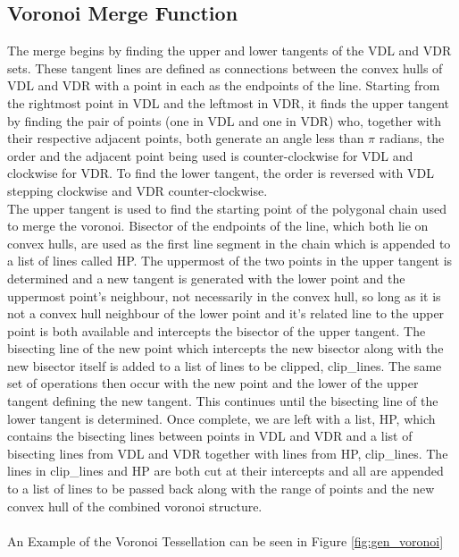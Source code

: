 \subsection{Voronoi Merge Function}
The merge begins by finding the upper and lower tangents of the VDL and VDR sets. These tangent lines are defined as connections between the convex hulls of VDL and VDR with a point in each as the endpoints of the line. Starting from the rightmost point in VDL and the leftmost in VDR, it finds the upper tangent by finding the pair of points (one in VDL and one in VDR) who, together with their respective adjacent points, both generate an angle less than $\pi$ radians, the order and the adjacent point being used is counter-clockwise for VDL and clockwise for VDR. To find the lower tangent, the order is reversed with VDL stepping clockwise and VDR counter-clockwise.
\\
The upper tangent is used to find the starting point of the polygonal chain used to merge the voronoi. Bisector of the endpoints of the line, which both lie on convex hulls, are used as the first line segment in the chain which is appended to a list of lines called HP. The uppermost of the two points in the upper tangent is determined and a new tangent is generated with the lower point and the uppermost point's neighbour, not necessarily in the convex hull, so long as it is not a convex hull neighbour of the lower point and it's related line to the upper point is both available and intercepts the bisector of the upper tangent. The bisecting line of the new point which intercepts the new bisector along with the new bisector itself is added to a list of lines to be clipped, clip\_lines. The same set of operations then occur with the new point and the lower of the upper tangent defining the new tangent. This continues until the bisecting line of the lower tangent is determined. Once complete, we are left with a list, HP, which contains the bisecting lines between points in VDL and VDR and a list of bisecting lines from VDL and VDR together with lines from HP, clip\_lines. The lines in clip\_lines and HP are both cut at their intercepts and all are appended to a list of lines to be passed back along with the range of points and the new convex hull of the combined voronoi structure.
\\
\\
An Example of the Voronoi Tessellation can be seen in Figure \ref{fig:gen_voronoi}
